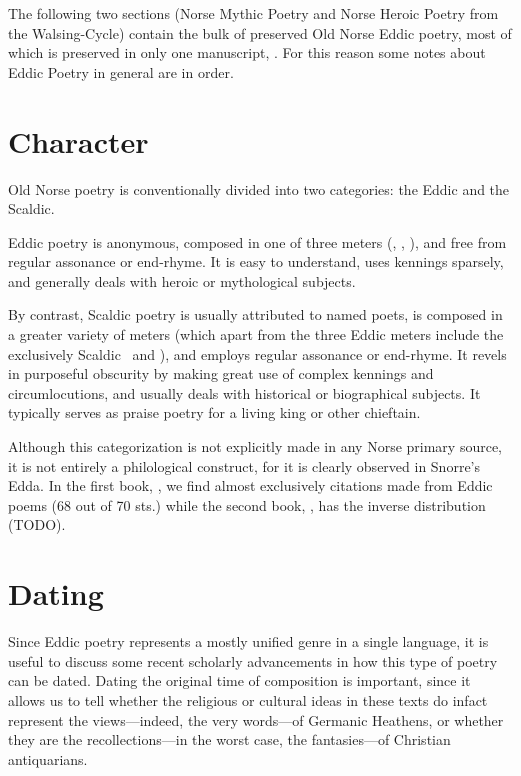 
The following two sections (Norse Mythic Poetry and Norse Heroic Poetry from the Walsing-Cycle) contain the bulk of preserved Old Norse Eddic poetry, most of which is preserved in only one manuscript, \Regius.  For this reason some notes about Eddic Poetry in general are in order.

\section{Character}

Old Norse poetry is conventionally divided into two categories: the Eddic and the Scaldic.

Eddic poetry is anonymous, composed in one of three meters (\Fornyrdislag, \Ljodahattr, \Malahattr), and free from regular assonance or end-rhyme.  It is easy to understand, uses kennings sparsely, and generally deals with heroic or mythological subjects.

By contrast, Scaldic poetry is usually attributed to named poets, is composed in a greater variety of meters (which apart from the three Eddic meters include the exclusively Scaldic \Kviduhattr\ and \Drottkvett), and employs regular assonance or end-rhyme.  It revels in purposeful obscurity by making great use of complex kennings and circumlocutions, and usually deals with historical or biographical subjects.  It typically serves as praise poetry for a living king or other chieftain.

Although this categorization is not explicitly made in any Norse primary source, it is not entirely a philological construct, for it is clearly observed in Snorre’s Edda.  In the first book, \Gylfaginning, we find almost exclusively citations made from Eddic poems (68 out of 70 sts.) while the second book, \Skaldskaparmal, has the inverse distribution (TODO).

\section{Dating}

Since Eddic poetry represents a mostly unified genre in a single language, it is useful to discuss some recent scholarly advancements in how this type of poetry can be dated.  Dating the original time of composition is important, since it allows us to tell whether the religious or cultural ideas in these texts do infact represent the views---indeed, the very words---of Germanic Heathens, or whether they are the recollections---in the worst case, the fantasies---of Christian antiquarians.

